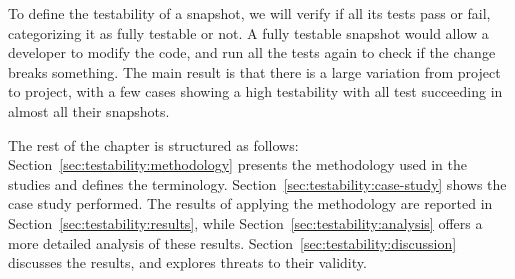 
To define the testability of a snapshot, we will verify if all its tests pass or fail, categorizing it as fully testable or not.
A fully testable snapshot would allow a developer to modify the code, and run all the tests again to check if the change breaks something.
The main result is that there is a large variation from project to project, with a few cases showing a high testability with all test succeeding in almost all their snapshots.



The rest of the chapter is structured as follows:
Section~\ref{sec:testability:methodology} presents the methodology used in the studies and defines the terminology. 
Section~\ref{sec:testability:case-study} shows the case study performed.
The results of applying the methodology are reported in Section~\ref{sec:testability:results}, while Section~\ref{sec:testability:analysis} offers a more detailed analysis of these results.
Section~\ref{sec:testability:discussion} discusses the results, and explores threats to their validity.
